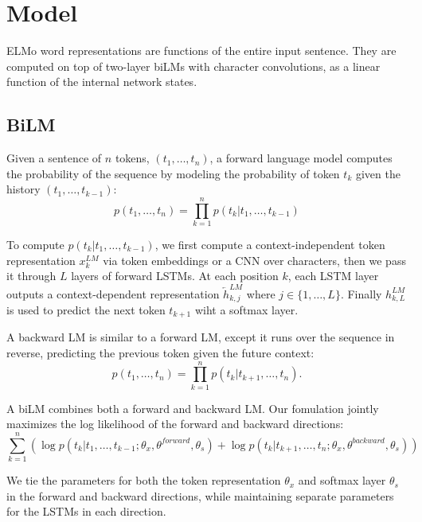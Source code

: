 \section{Model}

ELMo word representations are functions of the entire input sentence. They are
computed on top of two-layer biLMs with character convolutions, as a linear
function of the internal network states.

\subsection{BiLM}

Given a sentence of $n$ tokens, $(t_1, \dots, t_n)$, a forward language model
computes the probability of the sequence by modeling the probability of token
$t_k$ given the history $(t_1, \dots, t_{k-1})$:
\begin{equation}
    p(t_1, \dots, t_n) = \prod_{k=1}^n p(t_k | t_1, \dots, t_{k-1})
\end{equation}

To compute $p(t_k | t_1, \dots, t_{k-1})$, we first compute a
context-independent token representation $x_k^{LM}$ via token embeddings or a
CNN over characters, then we pass it through $L$ layers of forward LSTMs. At
each position $k$, each LSTM layer outputs a context-dependent representation
$\overleftarrow{h}_{k, j}^{LM}$ where $j \in \{1, \dots, L\}$. Finally $h_{k, L}^{LM}$ is
used to predict the next token $t_{k+1}$ wiht a softmax layer.

A backward LM is similar to a forward LM, except it runs over the sequence in
reverse, predicting the previous token given the future context:
\begin{equation}
    p(t_1, \dots, t_n) = \prod_{k=1}^n p(t_k | t_{k+1}, \dots, t_n).
\end{equation}

A biLM combines both a forward and backward LM. Our fomulation jointly maximizes
the log likelihood of the forward and backward directions:
\begin{equation}
    \sum_{k=1}^n 
    \left( \log p
    \left(t_k | t_1, \dots, t_{k-1}; \theta_x, \theta^{forward}, \theta_s\right)
    + \log p\left(t_k | t_{k+1}, \dots, t_n; \theta_x, \theta^{backward},
    \theta_s\right)
    \right)
\end{equation}

We tie the parameters for both the token representation $\theta_x$ and softmax
layer $\theta_s$ in the forward and backward directions, while maintaining
separate parameters for the LSTMs in each direction.

